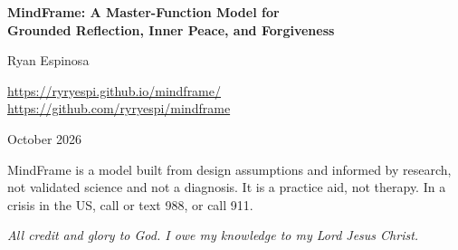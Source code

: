 \documentclass[10pt]{article}
\theoremstyle{definition}
\theoremstyle{remark}
\begin{document}
\begin{titlepage}
\centering
\vspace*{1.6in}
{\LARGE\bfseries MindFrame: A Master-Function Model for\\[4pt] Grounded Reflection, Inner Peace, and Forgiveness\par}
\vspace{0.5in}
{\Large Ryan Espinosa\par}
\vspace{0.2in}
{\small\url{https://ryryespi.github.io/mindframe/}\\[2pt]\url{https://github.com/ryryespi/mindframe}\par}
\vspace{0.3in}
{\large October 2026\par}
\vfill
\begin{minipage}{0.82\textwidth}\small\centering
MindFrame is a model built from design assumptions and informed by research, not validated science and not a diagnosis. It is a practice aid, not therapy. In a crisis in the US, call or text 988, or call 911.
\end{minipage}
\vspace*{0.6in}
\end{titlepage}

\thispagestyle{empty}
\vspace*{\fill}
\begin{center}
\itshape All credit and glory to God. I owe my knowledge to my Lord Jesus Christ.
\end{center}
\vspace*{\fill}
\clearpage
\setcounter{page}{1}
\end{document}
